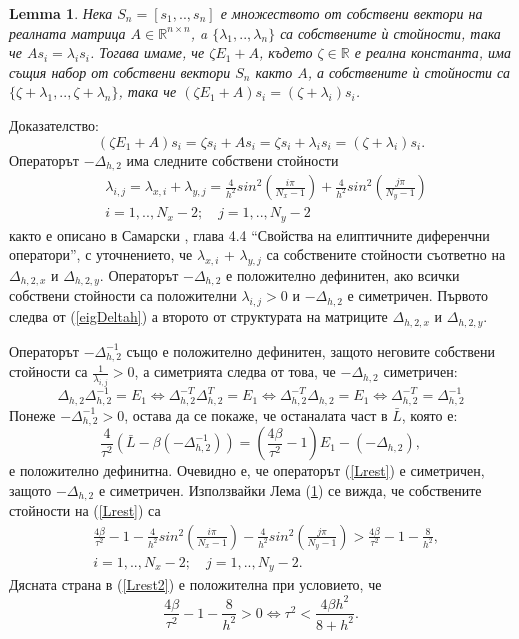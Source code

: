\documentclass[a4paper]{article}
\newcommand{\be}{\begin{equation}}
\newcommand{\ee}{\end{equation}}
\newcommand{\rf}[1]{(\ref{#1})}
\newcommand{\RR}{\mathbb{R}}
\newtheorem{lm}{Lemma}
\theoremstyle{remark}
\begin{document}
\begin{large}
\begin{lm}\label{lemma1}
Нека $S_n=[s_1,..,s_n]$ е множеството от собствени вектори на реалната матрица $A \in \RR^{n\times n}$,
a $\{\lambda_1,..,\lambda_n\}$ са собствените ѝ стойности, така че $A s_i = \lambda_i s_i$. Тогава имаме, че $\zeta E_1 + A$, където $\zeta \in \RR$ е реална константа, има същия набор от собствени вектори $S_n$ както $A$, а собствените ѝ стойности са $\{\zeta + \lambda_1,..,\zeta + \lambda_n\}$, така че $(\zeta E_1 + A)  s_i = (\zeta+ \lambda_i) s_i$.
\end{lm}
Доказателство:
\be
(\zeta E_1 + A)  s_i = \zeta s_i + A  s_i = \zeta s_i + \lambda_i s_i = (\zeta + \lambda_i) s_i.
\ee
Операторът $-\Delta_{h,2}$ има следните собствени стойности
\begin{align}\label{eigDeltah}
&\lambda_{i,j} = \lambda_{x, i} + \lambda_{y,j} = \frac{4}{h^2}sin^2(\frac{i \pi}{N_x-1}) +  \frac{4}{h^2}sin^2(\frac{j \pi}{N_y-1}) \\
&i = 1,..,N_x-2; \quad j = 1, .. , N_y-2 \nonumber
\end{align}
както е описано в Самарски \cite{samarski}, глава 4.4 ``Свойства на елиптичните диференчни оператори'', с уточнението, че $\lambda_{x, i}$ + $\lambda_{y,j}$ са собствените стойности съответно на $\Delta_{h,2,x}$ и $\Delta_{h,2,y}$. Операторът $-\Delta_{h,2}$ е положително дефинитен, ако всички собствени стойности са положителни $\lambda_{i,j}>0$ и $-\Delta_{h,2}$ е симетричен. Първото следва от \rf{eigDeltah} а второто от структурата на матриците $\Delta_{h,2,x}$ и $\Delta_{h,2,y}$.

Операторът $-\Delta_{h,2}^{-1}$ също е положително дефинитен, защото неговите собствени стойности са $\frac{1}{\lambda_{i,j}} > 0$, а симетрията следва от това, че $-\Delta_{h,2}$ симетричен:
\begin{equation*}
\Delta_{h,2}  \Delta_{h,2}^{-1} = E_1 \Leftrightarrow \Delta_{h,2}^{-T}  \Delta_{h,2}^{T} = E_1 \Leftrightarrow \Delta_{h,2}^{-T}  \Delta_{h,2} = E_1 
\Leftrightarrow \Delta_{h,2}^{-T} = \Delta_{h,2}^{-1} 
\end{equation*}
Понеже $-\Delta_{h,2}^{-1} > 0$, остава да се покаже, че останалата част в $\bar L$, която е:
\be\label{Lrest}
\frac{4}{\tau^2}\left( \bar L - \beta ( - \Delta_{h,2}^{-1}) \right) = \left( \frac{4 \beta}{\tau^2} - 1\right) E_1 -(-\Delta_{h,2}),
\ee
е положително дефинитна. Очевидно е, че операторът \rf{Lrest} е симетричен, защото $-\Delta_{h,2}$ е симетричен. Използвайки Лема \rf{lemma1} се вижда, че собствените стойности на \rf{Lrest} са
\begin{align}\label{Lrest2}
 &\frac{4 \beta}{\tau^2} - 1 - \frac{4}{h^2}sin^2(\frac{i \pi}{N_x-1}) - \frac{4}{h^2}sin^2(\frac{j \pi}{N_y-1}) > \frac{4 \beta}{\tau^2} - 1 - \frac{8}{h^2}, \\
&i = 1,..,N_x-2; \quad j = 1, .. , N_y-2. \nonumber
\end{align}
Дясната страна в \rf{Lrest2} е положителна при условието, че
\be\label{stabCond}
\frac{4 \beta}{\tau^2} - 1 - \frac{8}{h^2} > 0  \Leftrightarrow \tau^2 < \frac{4 \beta h^2}{8 + h^2}.
\ee


\end{large}
\end{document}
